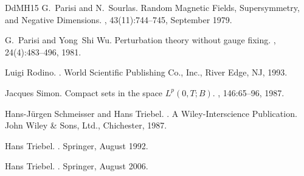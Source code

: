 \documentclass[a4paper,11pt]{article}
\numberwithin{equation}{section}
\newcommand{\8}{\infty}
\begin{document}
\begin{thebibliography}{DdMH15}
G.~Parisi and N.~Sourlas.
\newblock Random {Magnetic} {Fields}, {Supersymmetry}, and {Negative}
  {Dimensions}.
, 43(11):744--745, September 1979.

G.~Parisi and Yong~Shi Wu.
\newblock Perturbation theory without gauge fixing.
, 24(4):483--496, 1981.

Luigi Rodino.
.
\newblock World Scientific Publishing Co., Inc., River Edge, NJ, 1993.

Jacques Simon.
\newblock Compact sets in the space {$L^p(0,T;B)$}.
, 146:65--96, 1987.

Hans-J\"urgen Schmeisser and Hans Triebel.
.
\newblock A Wiley-Interscience Publication. John Wiley \& Sons, Ltd.,
  Chichester, 1987.

Hans Triebel.
.
\newblock Springer, August 1992.

Hans Triebel.
.
\newblock Springer, August 2006.

\end{thebibliography}
\end{document}
